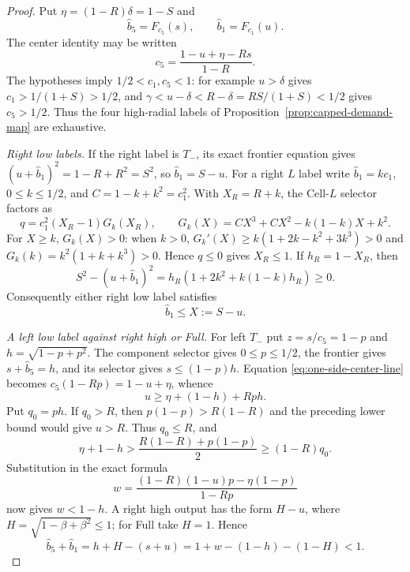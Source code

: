 \begin{proof}
Put $\eta=(1-R)\delta=1-S$ and
\[
 \widehat b_5=F_{c_5}(s),\qquad
 \widehat b_1=F_{c_1}(u).
\]
The center identity may be written
\begin{equation}
 c_5=\frac{1-u+\eta-Rs}{1-R}.
 \label{eq:one-side-center-line}
\end{equation}
The hypotheses imply $1/2<c_1,c_5<1$: for example
$u>\delta$ gives $c_1>1/(1+S)>1/2$, and
$\gamma<u-\delta<R-\delta=RS/(1+S)<1/2$ gives $c_5>1/2$.
Thus the four high-radial labels of
Proposition~\ref{prop:capped-demand-map} are exhaustive.

\smallskip\noindent
\emph{Right low labels.}
If the right label is $T_-$, its exact frontier equation gives
$(u+\widehat b_1)^2=1-R+R^2=S^2$, so $\widehat b_1=S-u$.  For a right $L$ label write
$\widehat b_1=kc_1$, $0\le k\le1/2$, and $C=1-k+k^2=c_1^2$.  With $X_R=R+k$, the
Cell-$L$ selector factors as
\[
 q=c_1^2(X_R-1)G_k(X_R),\qquad
 G_k(X)=CX^3+CX^2-k(1-k)X+k^2.
\]
For $X\ge k$, $G_k(X)>0$: when $k>0$,
$G_k'(X)\ge k(1+2k-k^2+3k^3)>0$ and
$G_k(k)=k^2(1+k+k^3)>0$.  Hence $q\le0$ gives $X_R\le1$.  If
$h_R=1-X_R$, then
\[
 S^2-(u+\widehat b_1)^2=h_R(1+2k^2+k(1-k)h_R)\ge0.
\]
Consequently either right low label satisfies
\begin{equation}
 \widehat b_1\le X:=S-u.
 \label{eq:one-side-right-low}
\end{equation}

\smallskip\noindent
\emph{A left low label against right high or Full.}
For left $T_-$ put $z=s/c_5=1-p$ and
$h=\sqrt{1-p+p^2}$.  The component selector gives
$0\le p\le1/2$, the frontier gives $s+\widehat b_5=h$, and its selector gives
$s\le(1-p)h$.  Equation \eqref{eq:one-side-center-line} becomes
$c_5(1-Rp)=1-u+\eta$, whence
\[
 u\ge \eta+(1-h)+Rph.
\]
Put $q_0=ph$.  If $q_0>R$, then
$p(1-p)>R(1-R)$ and the preceding lower bound would give $u>R$.
Thus $q_0\le R$, and
\[
 \eta+1-h>
 \frac{R(1-R)+p(1-p)}2\ge(1-R)q_0.
\]
Substitution in the exact formula
\[
 w=\frac{(1-R)(1-u)p-\eta(1-p)}{1-Rp}
\]
now gives $w<1-h$.  A right high output has the form $H-u$, where
$H=\sqrt{1-\beta+\beta^2}\le1$; for Full take $H=1$.  Hence
\[
 \widehat b_5+\widehat b_1=h+H-(s+u)=1+w-(1-h)-(1-H)<1.
\]


\end{proof}
